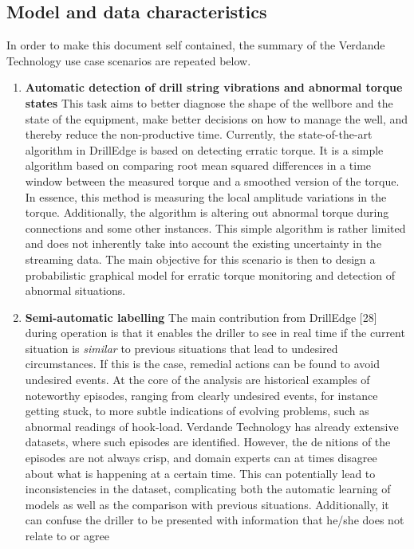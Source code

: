 \documentclass{article}
\theoremstyle{theorem}
\theoremstyle{definition}
\newcommand{\comment}[1]{ \begin{center}{\bf [[ #1 ]]}\end{center}}
\begin{document}
\subsection{Model and data characteristics}

In order to make this document self contained, the summary of the Verdande Technology use case scenarios are repeated below.

\begin{enumerate}
\item {\bf Automatic detection of drill string vibrations and abnormal torque
states} This task aims to better diagnose the shape of the wellbore and the
state of the equipment, make better decisions on how to manage the well, and
thereby reduce the non-productive time. Currently, the state-of-the-art algorithm
in DrillEdge is based on detecting erratic torque. It is a simple algorithm
based on comparing root mean squared differences in a time window between the
measured torque and a smoothed version of the torque. In essence, this method is
measuring the local amplitude variations in the torque. Additionally, the algorithm
is altering out abnormal torque during connections and some other instances. This
simple algorithm is rather limited and does not inherently take into account the
existing uncertainty in the streaming data. The main objective for this scenario
is then to design a probabilistic graphical model for erratic torque monitoring and
detection of abnormal situations.
\item {\bf Semi-automatic labelling} The main contribution from DrillEdge [28] during
operation is that it enables the driller to see in real time if the current situation
is \emph{ similar} to previous situations that lead to undesired circumstances. If this
is the case, remedial actions can be found to avoid undesired events. At the
core of the analysis are historical examples of noteworthy episodes, ranging from
clearly undesired events, for instance getting stuck, to more subtle indications of
evolving problems, such as abnormal readings of hook-load. Verdande Technology
has already extensive datasets, where such episodes are identified. However, the
denitions of the episodes are not always crisp, and domain experts can at times
disagree about what is happening at a certain time. This can potentially lead to
inconsistencies in the dataset, complicating both the automatic learning of models
as well as the comparison with previous situations. Additionally, it can confuse
the driller to be presented with information that he/she does not relate to or agree

\end{enumerate}
\end{document}
